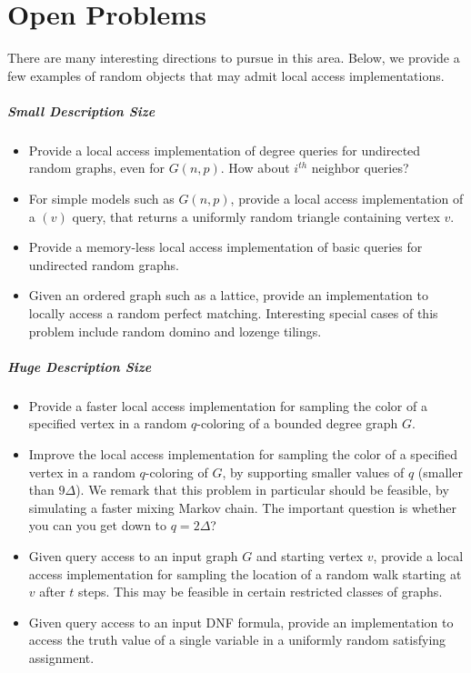 \section{Open Problems}%
\label{sec:open_problems}
There are many interesting directions to pursue in this area.
Below, we provide a few examples of random objects that may admit local access implementations.

\subparagraph*{Small Description Size}
\label{par:small_description_size}
\begin{itemize}
    \item Provide a local access implementation of degree queries for undirected random graphs, even for $G(n,p)$.
    How about $i^{th}$ neighbor queries?
    \item For simple models such as $G(n,p)$, provide a local access implementation of a $(v)$ query,
    that returns a uniformly random triangle containing vertex $v$.
    \item Provide a memory-less local access implementation of basic queries for undirected random graphs.
    \item Given an ordered graph such as a lattice, provide an implementation to locally access a random perfect matching.
    Interesting special cases of this problem include random domino and lozenge tilings.
\end{itemize}

\subparagraph*{Huge Description Size}
\label{par:huge_description_size}
\begin{itemize}
    \item Provide a faster local access implementation for sampling the color of a specified vertex
    in a random $q$-coloring of a bounded degree graph $G$.
    \item Improve the local access implementation for sampling the color of a specified vertex in a random $q$-coloring of $G$,
    by supporting smaller values of $q$ (smaller than $9\Delta$).
    We remark that this problem in particular should be feasible, by simulating a faster mixing Markov chain.
    The important question is whether you can you get down to $q = 2\Delta$?
    \item Given query access to an input graph $G$ and starting vertex $v$,
    provide a local access implementation for sampling the location of a random walk starting at $v$ after $t$ steps.
    This may be feasible in certain restricted classes of graphs.
    \item Given query access to an input DNF formula, provide an implementation to access the truth value of a single variable in a uniformly random satisfying assignment.
\end{itemize}
